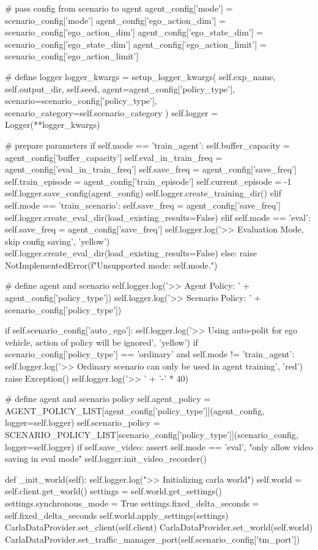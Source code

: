 \begin{appendix}
\# pass config from scenario to agent
agent\_config['mode'] = scenario\_config['mode']
agent\_config['ego\_action\_dim'] = scenario\_config['ego\_action\_dim']
agent\_config['ego\_state\_dim'] = scenario\_config['ego\_state\_dim']
agent\_config['ego\_action\_limit'] = scenario\_config['ego\_action\_limit']

\# define logger
logger\_kwargs = setup\_logger\_kwargs(
self.exp\_name, 
self.output\_dir, 
self.seed,
agent=agent\_config['policy\_type'],
scenario=scenario\_config['policy\_type'],
scenario\_category=self.scenario\_category
)
self.logger = Logger(**logger\_kwargs)

\# prepare parameters
if self.mode == 'train\_agent':
self.buffer\_capacity = agent\_config['buffer\_capacity']
self.eval\_in\_train\_freq = agent\_config['eval\_in\_train\_freq']
self.save\_freq = agent\_config['save\_freq']
self.train\_episode = agent\_config['train\_episode']
self.current\_episode = -1
self.logger.save\_config(agent\_config)
self.logger.create\_training\_dir()
elif self.mode == 'train\_scenario':
self.save\_freq = agent\_config['save\_freq']
self.logger.create\_eval\_dir(load\_existing\_results=False)
elif self.mode == 'eval':
self.save\_freq = agent\_config['save\_freq']
self.logger.log('>> Evaluation Mode, skip config saving', 'yellow')
self.logger.create\_eval\_dir(load\_existing\_results=False)
else:
raise NotImplementedError(f"Unsupported mode: {self.mode}.")

\# define agent and scenario
self.logger.log('>> Agent Policy: ' + agent\_config['policy\_type'])
self.logger.log('>> Scenario Policy: ' + scenario\_config['policy\_type'])

if self.scenario\_config['auto\_ego']:
self.logger.log('>> Using auto-polit for ego vehicle, action of policy will be ignored', 'yellow')
if scenario\_config['policy\_type'] == 'ordinary' and self.mode != 'train\_agent':
self.logger.log('>> Ordinary scenario can only be used in agent training', 'red')
raise Exception()
self.logger.log('>> ' + '-' * 40)

\# define agent and scenario policy
self.agent\_policy = AGENT\_POLICY\_LIST[agent\_config['policy\_type']](agent\_config, logger=self.logger)
self.scenario\_policy = SCENARIO\_POLICY\_LIST[scenario\_config['policy\_type']](scenario\_config, logger=self.logger)
if self.save\_video:
assert self.mode == 'eval', "only allow video saving in eval mode"
self.logger.init\_video\_recorder()

def \_init\_world(self):
self.logger.log(">> Initializing carla world")
self.world = self.client.get\_world()
settings = self.world.get\_settings()
settings.synchronous\_mode = True
settings.fixed\_delta\_seconds = self.fixed\_delta\_seconds
self.world.apply\_settings(settings)
CarlaDataProvider.set\_client(self.client)
CarlaDataProvider.set\_world(self.world)
CarlaDataProvider.set\_traffic\_manager\_port(self.scenario\_config['tm\_port'])


\end{appendix}
